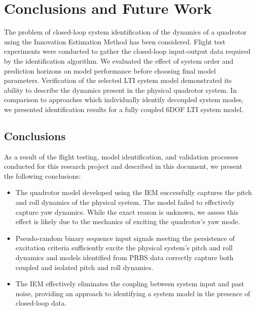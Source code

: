 \chapter{Conclusions and Future Work}
The problem of closed-loop system identification of the dynamics of a quadrotor using the Innovation Estimation Method has been considered. Flight test experiments were conducted to gather the closed-loop input-output data required by the identification algorithm. We evaluated the effect of system order and prediction horizons on model performance before choosing final model parameters. Verification of the selected LTI system model demonstrated its ability to describe   the dynamics present in the physical quadrotor system. In comparison to approaches which individually identify decoupled system modes, we presented identification results for a fully coupled 6DOF LTI system model.

\section{Conclusions}
As a result of the flight testing, model identification, and validation processes conducted for this research project and described in this document, we present the following conclusions:
\begin{itemize}
\item The quadrotor model developed using the IEM successfully captures the pitch and roll dynamics of the physical system. The model failed to effectively capture yaw dynamics. While the exact reason is unknown, we assess this effect is likely due to the mechanics of exciting the quadrotor's yaw mode.
\item Pseudo-random binary sequence input signals meeting the persistence of excitation criteria sufficiently excite the physical system's pitch and roll dynamics and models identified from PRBS data correctly capture both coupled and isolated pitch and roll dynamics. 
\item The IEM effectively eliminates the coupling between system input and past noise, providing an approach to identifying a system model in the presence of closed-loop data.
\end{itemize}


